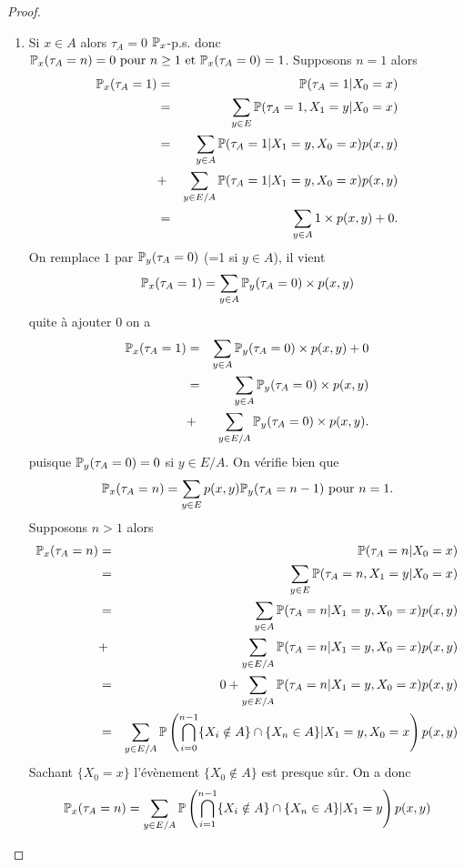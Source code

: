\begin{proof}
\begin{enumerate}
    \item Si $x\in A$ alors $\tau_A = 0$ $\mathbb{P}_x$-p.s. donc
    $\mathbb{P}_x(\tau_A=n)=0\text{ pour }n\geq1\text{ et }\mathbb{P}_x(\tau_A=0)=1$.
    Supposons $n = 1$ alors
    \begin{eqnarray*}
        \mathbb{P}_x(\tau_A=1)&=&\mathbb{P}(\tau_A=1|X_0=x)\\
        &=&\sum_{y\in E} \mathbb{P}(\tau_A=1, X_1=y|X_0=x)\\
        &=&\sum_{y\in A} \mathbb{P}(\tau_A=1 |X_1=y,X_0=x)p(x,y) \\
        &+& \sum_{y\in E/A} \mathbb{P}(\tau_A=1|X_1=y,X_0=x)p(x,y)\\
        &=&\sum_{y\in A} 1\times  p(x,y) + 0.\\
    \end{eqnarray*}
    On remplace $1$ par $\mathbb{P}_y(\tau_A=0)$ (=1 si $y\in A$), il vient
    $$
    \mathbb{P}_x(\tau_A=1)= \sum_{y\in A} \mathbb{P}_y(\tau_A=0)\times  p(x,y)
    $$
    quite à ajouter $0$ on a
    \begin{eqnarray*}
    \mathbb{P}_x(\tau_A=1)&=& \sum_{y\in A} \mathbb{P}_y(\tau_A=0)\times  p(x,y) + 0\\
     &=&\sum_{y\in A} \mathbb{P}_y(\tau_A=0)\times  p(x,y)\\
     &+& \sum_{y\in E/A} \mathbb{P}_y(\tau_A=0)\times  p(x,y).
    \end{eqnarray*}
    puisque $\mathbb{P}_y(\tau_A=0) = 0$ si $y\in E/A$. On vérifie bien que
    $$
    \mathbb{P}_x(\tau_A=n)=\sum_{y\in E}p(x,y)\mathbb{P}_y(\tau_A=n-1)\text{ pour }n = 1.
    $$
    Supposons $n>1$ alors
    \begin{eqnarray*}
    \mathbb{P}_x(\tau_A=n)&=&\mathbb{P}(\tau_A=n|X_0=x)\\
    &=&\sum_{y\in E} \mathbb{P}(\tau_A=n, X_1=y|X_0=x)\\
    &=&\sum_{y\in A} \mathbb{P}(\tau_A=n |X_1=y,X_0=x)p(x,y) \\
    &+& \sum_{y\in E/A} \mathbb{P}(\tau_A=n|X_1=y,X_0=x)p(x,y)\\
    &=& 0+ \sum_{y\in E/A} \mathbb{P}(\tau_A=n|X_1=y,X_0=x)p(x,y)\\
    &=&  \sum_{y\in E/A} \mathbb{P}\left(\bigcap_{i = 0}^{n-1}\{X_i\notin A\}\cap\{X_n\in A\}|X_1=y,X_0=x\right)p(x,y)\\
    \end{eqnarray*}
    Sachant $\{X_0 = x\}$ l'évènement $\{X_0 \notin A\}$ est presque sûr. On a donc
     $$
     \mathbb{P}_x(\tau_A=n)=  \sum_{y\in E/A} \mathbb{P}\left(\bigcap_{i = 1}^{n-1}\{X_i\notin A\}\cap\{X_n\in A\}|X_1=y\right)p(x,y)
$$
\end{enumerate}
\end{proof}

